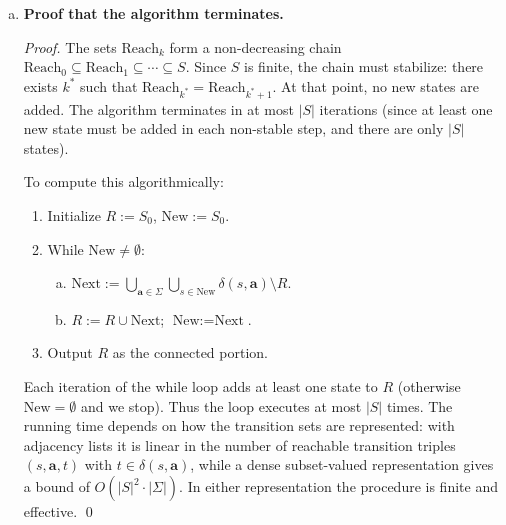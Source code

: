 \begin{enumerate}[{4.}1.]
\begin{enumerate}[(a)]
  \item \textbf{Proof that the algorithm terminates.}

  \begin{proof}
  The sets $\text{Reach}_k$ form a non-decreasing chain
  $\text{Reach}_0\subseteq\text{Reach}_1\subseteq\cdots\subseteq S$.
  Since $S$ is finite, the chain must stabilize: there exists $k^*$ such that
  $\text{Reach}_{k^*}=\text{Reach}_{k^*+1}$.  At that point, no new states are
  added.  The algorithm terminates in at most $|S|$ iterations (since at least
  one new state must be added in each non-stable step, and there are only $|S|$
  states).

  To compute this algorithmically:
  \begin{enumerate}[1.]
    \item Initialize $R:=S_0$, $\text{New}:=S_0$.
    \item While $\text{New}\neq\emptyset$:
      \begin{enumerate}[(a)]
        \item $\text{Next}:=\bigcup_{\pmb{a}\in\Sigma}\bigcup_{s\in\text{New}}
              \delta(s,\pmb{a})\setminus R$.
        \item $R:=R\cup\text{Next}$; $\text{New}:=\text{Next}$.
      \end{enumerate}
    \item Output $R$ as the connected portion.
  \end{enumerate}
  Each iteration of the while loop adds at least one state to $R$ (otherwise
  $\text{New}=\emptyset$ and we stop).  Thus the loop executes at most $|S|$
  times.  The running time depends on how the transition sets are represented:
  with adjacency lists it is linear in the number of reachable transition
  triples $(s,\pmb{a},t)$ with $t\in\delta(s,\pmb{a})$, while a dense
  subset-valued representation gives a bound of $O(|S|^2\cdot|\Sigma|)$.
  In either representation the procedure is finite and effective. \qed
  \end{proof}
\end{enumerate}

\end{enumerate}

